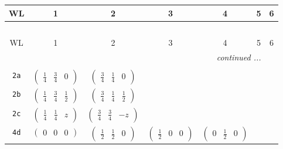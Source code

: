 \documentclass[fleqn,9pt,landscape]{jsarticle}
\begin{document}
\begin{center}
\renewcommand{\arraystretch}{1.2}
\begin{longtable}{ccccccc}
 \hline \hline
WL & 1 & 2 & 3 & 4 & 5 & 6 \\ \hline \endfirsthead

\multicolumn{6}{l}{\tablename\ \thetable{}} \\
 \hline \hline
WL & 1 & 2 & 3 & 4 & 5 & 6 \\ \hline \endhead

 \hline \hline
\multicolumn{6}{r}{\footnotesize\it continued ...} \\ \endfoot

 \hline \hline
\multicolumn{6}{r}{} \\ \endlastfoot

{\tt 2a} & $ \begin{pmatrix} \frac{1}{4} & \frac{3}{4} & 0 \end{pmatrix} $ & $ \begin{pmatrix} \frac{3}{4} & \frac{1}{4} & 0 \end{pmatrix} $ & $  $ & $  $ & $  $ & $  $ \\ \hline
{\tt 2b} & $ \begin{pmatrix} \frac{1}{4} & \frac{3}{4} & \frac{1}{2} \end{pmatrix} $ & $ \begin{pmatrix} \frac{3}{4} & \frac{1}{4} & \frac{1}{2} \end{pmatrix} $ & $  $ & $  $ & $  $ & $  $ \\ \hline
{\tt 2c} & $ \begin{pmatrix} \frac{1}{4} & \frac{1}{4} & z \end{pmatrix} $ & $ \begin{pmatrix} \frac{3}{4} & \frac{3}{4} & - z \end{pmatrix} $ & $  $ & $  $ & $  $ & $  $ \\ \hline
{\tt 4d} & $ \begin{pmatrix} 0 & 0 & 0 \end{pmatrix} $ & $ \begin{pmatrix} \frac{1}{2} & \frac{1}{2} & 0 \end{pmatrix} $ & $ \begin{pmatrix} \frac{1}{2} & 0 & 0 \end{pmatrix} $ & $ \begin{pmatrix} 0 & \frac{1}{2} & 0 \end{pmatrix} $ & $  $ & $  $ \\ \hline

\end{longtable}
\end{center}
\end{document}
